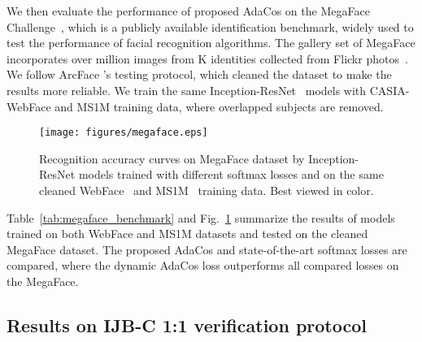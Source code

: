 \documentclass[10pt,twocolumn,letterpaper]{article}
\begin{document}
We then evaluate the performance of proposed AdaCos on the MegaFace Challenge~\cite{MegaFace2}, which is a publicly available identification benchmark, widely used to test the performance of facial recognition algorithms.
The gallery set of MegaFace incorporates over  million images from K identities collected from Flickr photos~\cite{thomee2015yfcc100m}. We follow ArcFace \cite{ArcFace}'s testing protocol, which cleaned the dataset to make the results more reliable. We train the same Inception-ResNet~\cite{IR} models with CASIA-WebFace \cite{WebFace} and MS1M \cite{MS-Celeb-1M} training data, where overlapped subjects are removed. 


\begin{figure}[t]
\begin{center}
   \texttt{[image: figures/megaface.eps]}
\end{center}
   \caption{ Recognition accuracy curves on MegaFace dataset by Inception-ResNet \cite{szegedy2017inception} models trained with different softmax losses and on the same cleaned WebFace~\cite{WebFace} and MS1M~\cite{MS-Celeb-1M} training data. Best viewed in color.
    }
\label{fig:megaface}

\end{figure}


Table~\ref{tab:megaface_benchmark} and Fig.~\ref{fig:megaface} summarize the results of models trained on both WebFace and MS1M datasets and tested on the cleaned MegaFace dataset. The proposed AdaCos and state-of-the-art softmax losses are compared, where the dynamic AdaCos loss outperforms all compared losses on the MegaFace.


\subsection{Results on IJB-C 1:1 verification protocol}
\end{document}
